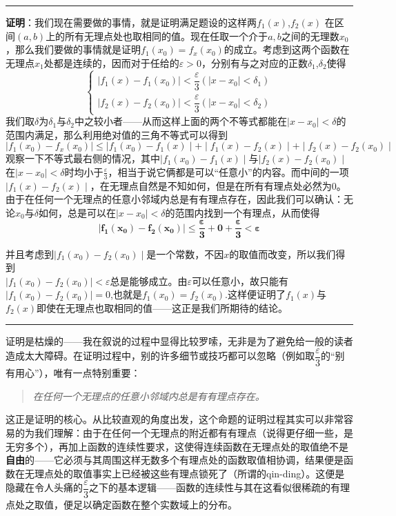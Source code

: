 \documentclass[12pt,a4paper]{article}
\begin{document}
{{			\vspace{22pt}\hrule\vspace{11pt}
			{\bfseries 证明}：我们现在需要做的事情，就是证明满足题设的这样两$f_1(x)$,$f_2(x)$	在区间$(a,b)$上的所有无理点处也取相同的值。现在任取一个介于$a,b$之间的无理数$x_0$，那么我们要做的事情就是证明$f_1(x_0)=f_x(x_0)$的成立。考虑到这两个函数在无理点$x_1$处都是连续的，因而对于任给的$\varepsilon>0$，分别有与之对应的正数$\delta_1$,$\delta_2$使得
			\[
			\begin{cases}
			\mid f_1(x)-f_1(x_0)\mid < \dfrac{\varepsilon}{3}(\mid x-x_0\mid<\delta_1)\\
			\mid f_2(x)-f_2(x_0)\mid < \dfrac{\varepsilon}{3}(\mid x-x_0\mid<\delta_2)
			\end{cases}
			\]
			我们取$\delta$为$\delta_1$与$\delta_2$中之较小者——从而这样上面的两个不等式都能在$\mid x-x_0\mid<\delta$的范围内满足，那么利用绝对值的三角不等式可以得到
			\[{
			\mid f_1(x_0)-f_x(x_0)\mid\le\mid f_1(x_0)-f_1(x)\mid +\mid f_1(x)-f_2(x)\mid+\mid f_2(x)-f_2(x_0)\mid }
			\]
			观察一下不等式最右侧的情况，其中$\mid f_1(x_0)-f_1(x)\mid$与$\mid f_2(x)-f_2(x_0)\mid$在$\mid x-x_0\mid<\delta$时均小于$\frac{\varepsilon}{3}$，相当于说它俩都是可以“任意小”的内容。而中间的一项$\mid f_1(x)-f_2(x)\mid$，在无理点自然是不知如何，但是在所有有理点处必然为0。由于在任何一个无理点的任意小邻域内总是有有理点存在，因此我们可以确认：无论$x_0$与$\delta$如何，总是可以在$\mid x-x_0\mid<\delta$的范围内找到一个有理点，从而使得
			\[\boldsymbol{
			\mid f_1(x_0)-f_2(x_0)\mid\le\frac{\varepsilon}{3}+0+\frac{\varepsilon}{3}<\varepsilon}
			\]}
			并且考虑到$\mid f_1(x_0)-f_2(x_0)\mid$是一个常数，不因$x$的取值而改变，所以我们得到\\$\mid f_1(x_0)-f_2(x_0)\mid<\varepsilon$总是能够成立。由$\varepsilon$可以任意小，故只能有$\mid f_1(x_0)-f_2(x_0)\mid=0$,也就是$f_1(x_0)=f_2(x_0)$.这样便证明了$f_1(x)$与$f_2(x)$即使在无理点也取相同的值——这正是我们所期待的结论。
			\vspace{11pt}\hrule\vspace{11pt}
			
			证明是枯燥的——我在叙说的过程中显得比较罗嗦，无非是为了避免给一般的读者造成太大障碍。在证明过程中，别的许多细节或技巧都可以忽略（例如取$\dfrac{\varepsilon}{3}$的“别有用心”），唯有一点特别重要：
			\begin{quote}\itshape
				在任何一个无理点的任意小邻域内总是有有理点存在。
			\end{quote}
			这正是证明的核心。从比较直观的角度出发，这个命题的证明过程其实可以非常容易的为我们理解：由于在任何一个无理点的附近都有有理点（说得更仔细一些，是无穷多个），再加上函数的连续性要求，这使得连续函数在无理点处的取值绝不是{\bfseries 自由}的——它必须与其周围这样无数多个有理点处的函数取值相协调，结果便是函数在无理点处的取值事实上已经被这些有理点锁死了（所谓的qin-ding）。这便是隐藏在令人头痛的$\dfrac{\varepsilon}{3}$之下的基本逻辑——函数的连续性与其在这看似很稀疏的有理点处之取值，便足以确定函数在整个实数域上的分布。
			
}
\end{document}
